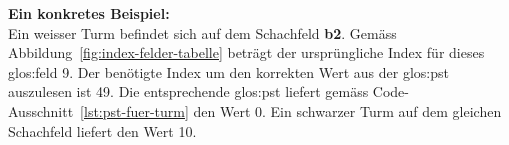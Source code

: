 \textbf{Ein konkretes Beispiel:} \\
Ein weisser Turm befindet sich auf dem Schachfeld \textbf{b2}.
Gemäss Abbildung~\ref{fig:index-felder-tabelle} beträgt der ursprüngliche Index für dieses \gls{glos:feld} 9.
Der benötigte Index um den korrekten Wert aus der \gls{glos:pst} auszulesen ist 49.
Die entsprechende \gls{glos:pst} liefert gemäss Code-Ausschnitt~\ref{lst:pst-fuer-turm} den Wert 0.
Ein schwarzer Turm auf dem gleichen Schachfeld liefert den Wert 10.